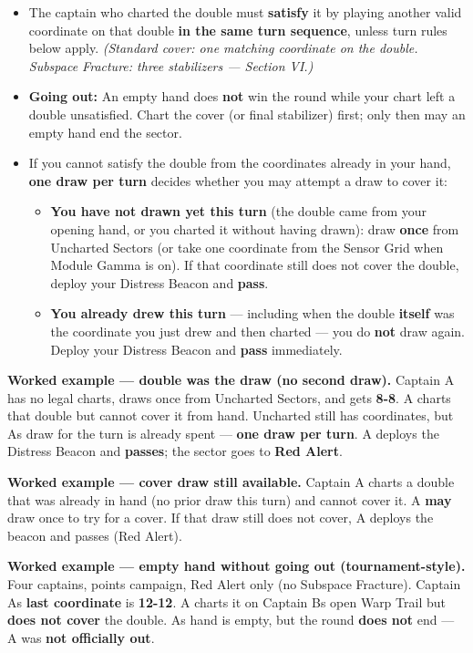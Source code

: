 \documentclass[11pt]{article}
\providecommand{\tightlist}{%
  \setlength{\itemsep}{0pt}\setlength{\parskip}{0pt}}
\begin{document}
\begin{itemize}
\tightlist
\item
  The captain who charted the double must \textbf{satisfy} it by playing
  another valid coordinate on that double \textbf{in the same turn sequence},
  unless turn rules below apply. \emph{(Standard cover: one matching
  coordinate on the double. Subspace Fracture: three stabilizers --- Section
  VI.)}
\item
  \textbf{Going out:} An empty hand does \textbf{not} win the round
  while your chart left a double unsatisfied. Chart the cover (or final
  stabilizer) first; only then may an empty hand end the sector.
\item
  If you cannot satisfy the double from the coordinates already in your
  hand, \textbf{one draw per turn} decides whether you may attempt a
  draw to cover it:
  \begin{itemize}
  \tightlist
  \item
    \textbf{You have not drawn yet this turn} (the double came from your
    opening hand, or you charted it without having drawn): draw
    \textbf{once} from Uncharted Sectors (or take one coordinate from the
    Sensor Grid when Module Gamma is on). If that coordinate still does
    not cover the double, deploy your Distress Beacon and \textbf{pass}.
  \item
    \textbf{You already drew this turn} --- including when the double
    \textbf{itself} was the coordinate you just drew and then charted
    --- you do \textbf{not} draw again. Deploy your Distress Beacon and
    \textbf{pass} immediately.
  \end{itemize}
\end{itemize}

\textbf{Worked example --- double was the draw (no second draw).}
Captain A has no legal charts, draws once from Uncharted Sectors, and
gets \textbf{8-8}. A charts that double but cannot cover it from hand.
Uncharted still has coordinates, but A\textquotesingle s draw for the turn
is already spent --- \textbf{one draw per turn}. A deploys the Distress
Beacon and \textbf{passes}; the sector goes to \textbf{Red Alert}.

\textbf{Worked example --- cover draw still available.}
Captain A charts a double that was already in hand (no prior draw this
turn) and cannot cover it. A \textbf{may} draw once to try for a cover.
If that draw still does not cover, A deploys the beacon and passes
(Red Alert).

\textbf{Worked example --- empty hand without going out
(tournament-style).} Four captains, points campaign, Red Alert only (no
Subspace Fracture). Captain A\textquotesingle s \textbf{last coordinate} is
\textbf{12-12}. A charts it on Captain B\textquotesingle s open Warp
Trail but \textbf{does not cover} the double. A\textquotesingle s hand
is empty, but the round \textbf{does not} end --- A was \textbf{not
officially out}.
\end{document}
